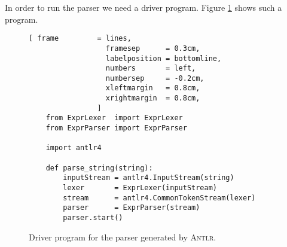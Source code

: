 In order to run the parser we need a driver program.  Figure \ref{fig:PureParser.ipynb} shows such a program.

\begin{figure}[!ht]
\centering
\begin{Verbatim}[ frame         = lines, 
                  framesep      = 0.3cm, 
                  labelposition = bottomline,
                  numbers       = left,
                  numbersep     = -0.2cm,
                  xleftmargin   = 0.8cm,
                  xrightmargin  = 0.8cm,
                ]
    from ExprLexer  import ExprLexer
    from ExprParser import ExprParser
    
    import antlr4
    
    def parse_string(string): 
        inputStream = antlr4.InputStream(string)
        lexer       = ExprLexer(inputStream)
        stream      = antlr4.CommonTokenStream(lexer)
        parser      = ExprParser(stream)
        parser.start()
\end{Verbatim}
\vspace*{-0.3cm}
\caption{Driver program for the parser generated by \textsc{Antlr}.}
\label{fig:PureParser.ipynb}
\end{figure}

